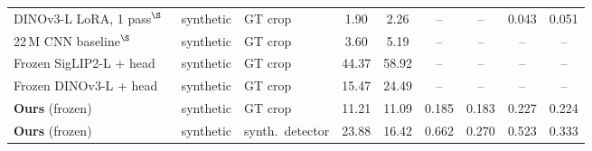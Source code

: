\begin{tabular}{@{}l l l cc cc cc@{}}
DINOv3-L LoRA, 1 pass$^\S$~\cite{church2026vfm} & synthetic & GT crop & 1.90 & 2.26 & -- & -- & 0.043 & 0.051 \\
22\,M CNN baseline$^\S$~\cite{church2026vfm} & synthetic & GT crop & 3.60 & 5.19 & -- & -- & -- & -- \\
Frozen SigLIP2-L + head~\cite{church2026vfm} & synthetic & GT crop & 44.37 & 58.92 & -- & -- & -- & -- \\
Frozen DINOv3-L + head~\cite{church2026vfm} & synthetic & GT crop & 15.47 & 24.49 & -- & -- & -- & -- \\
\midrule
\textbf{Ours} (frozen) & synthetic & GT crop & 11.21 & 11.09 & 0.185 & 0.183 & 0.227 & 0.224 \\
\textbf{Ours} (frozen) & synthetic & synth.\ detector & 23.88 & 16.42 & 0.662 & 0.270 & 0.523 & 0.333 \\
\bottomrule
\end{tabular}